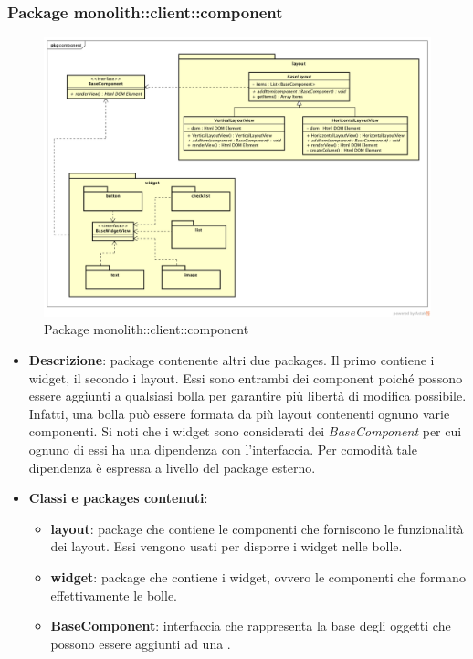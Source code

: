 \subsubsection{Package monolith::client::component}
\label{Package monolith::client::component}
\begin{figure}[H]
	\centering
	\includegraphics[width=\textwidth]{Sezioni/Packages/SDK/component.png}
	\caption{Package monolith::client::component}
\end{figure}

\begin{itemize}
\item \textbf{Descrizione}: package contenente altri due packages. Il primo contiene i widget, il secondo i layout. Essi sono entrambi dei component poiché possono essere aggiunti a qualsiasi bolla per garantire più libertà di modifica possibile. Infatti, una bolla può essere formata da più layout contenenti ognuno varie componenti.
Si noti che i widget sono considerati dei \textit{BaseComponent} per cui ognuno di essi ha una dipendenza con l'interfaccia. Per comodità tale dipendenza è espressa a livello del package esterno.
\item \textbf{Classi e packages contenuti}:
\begin{itemize}
\item \textbf{layout}: package che contiene le componenti che forniscono le funzionalità dei layout. Essi vengono usati per disporre i widget nelle bolle.
\item \textbf{widget}: package che contiene i widget, ovvero le componenti che formano effettivamente le bolle.
\item \textbf{BaseComponent}: interfaccia che rappresenta la base degli oggetti che possono essere aggiunti ad una .
\end{itemize}
\end{itemize}

